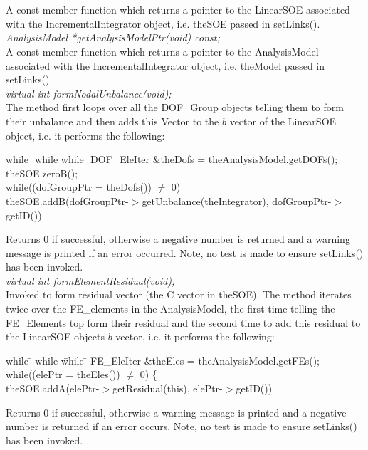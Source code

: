   \\
 \\
A const member function which returns a pointer to the LinearSOE
associated with the IncrementalIntegrator object, i.e. \p theSOE
passed in setLinks(). \\

{\em AnalysisModel *getAnalysisModelPtr(void) const;} \\
A const member function which returns a pointer to the AnalysisModel
associated with the IncrementalIntegrator object, i.e. \p theModel
passed in setLinks(). \\


{\em virtual int formNodalUnbalance(void);} \\
The method first
loops over all the DOF\_Group objects telling them to form their
unbalance and then adds this Vector to the $b$ vector of the LinearSOE
object, i.e. it performs the following: \\
\begin{tabbing}
while \= \+ while \= while \= \kill
DOF\_EleIter \&theDofs = theAnalysisModel.getDOFs();\\
theSOE.zeroB();\\
while((dofGroupPtr = theDofs()) $\neq$ 0) \+ \\
theSOE.addB(dofGroupPtr-$>$getUnbalance(theIntegrator),
dofGroupPtr-$>$getID()) \\
\end{tabbing}
\noindent Returns $0$ if successful, otherwise a  negative number is
returned and a warning message is printed if an error occurred. Note,
no test is made to ensure setLinks() has been invoked.\\


{\em virtual int formElementResidual(void);} \\
Invoked to form residual vector (the C vector in theSOE). The method
iterates twice over the FE\_elements in the AnalysisModel, the first
time telling the FE\_Elements top form their residual and the second
time to add this residual to the LinearSOE objects $b$ vector, i.e. it
performs the following:
\begin{tabbing}
while \= \+ while \= while \= \kill
FE\_EleIter \&theEles = theAnalysisModel.getFEs();\\
while((elePtr = theEles()) $\neq$ 0) \{ \+ \\
theSOE.addA(elePtr-$>$getResidual(this), elePtr-$>$getID()) \+ \\ 
\end{tabbing}
\noindent Returns $0$ if successful, otherwise a warning message is
printed and a negative number is returned if an error occurs. Note, no
test is made to ensure setLinks() has been invoked.\\




